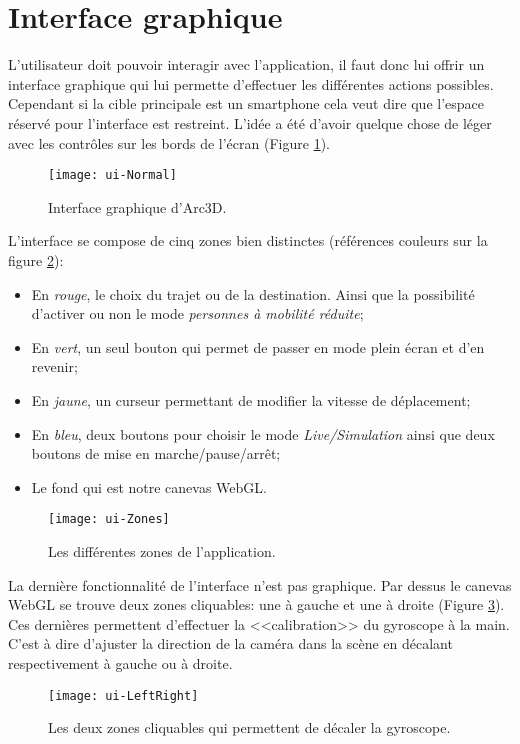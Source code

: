 \section{Interface graphique}
L'utilisateur doit pouvoir interagir avec l'application, il faut donc lui offrir un interface graphique qui lui permette d'effectuer les différentes actions possibles. Cependant si la cible principale est un smartphone cela veut dire que l'espace réservé pour l'interface est restreint. L'idée a été d'avoir quelque chose de léger avec les contrôles sur les bords de l'écran (Figure \ref{fig:ui-normal}).

\begin{figure}[H]
	\centering
	\texttt{[image: ui-Normal]}
	\caption{Interface graphique d'Arc3D.}
	\label{fig:ui-normal}
\end{figure}

L'interface se compose de cinq zones bien distinctes (références couleurs sur la figure \ref{fig:ui-zones}):
\begin{itemize}
	\item En \emph{rouge}, le choix du trajet ou de la destination. Ainsi que la possibilité d'activer ou non le mode \textit{personnes à mobilité réduite};
	\item En \emph{vert}, un seul bouton qui permet de passer en mode plein écran et d'en revenir;
	\item En \emph{jaune}, un curseur permettant de modifier la vitesse de déplacement;
	\item En \emph{bleu}, deux boutons pour choisir le mode \textit{Live/Simulation} ainsi que deux boutons de mise en marche/pause/arrêt;
	\item Le fond qui est notre canevas WebGL.
\end{itemize}

\begin{figure}[H]
	\centering
	\texttt{[image: ui-Zones]}
	\caption{Les différentes zones de l'application.}
	\label{fig:ui-zones}
\end{figure}

La dernière fonctionnalité de l'interface n'est pas graphique. Par dessus le canevas WebGL se trouve deux zones cliquables: une à gauche et une à droite (Figure \ref{fig:ui-leftright}). Ces dernières permettent d'effectuer la <<calibration>> du gyroscope à la main. C'est à dire d'ajuster la direction de la caméra dans la scène en décalant respectivement à gauche ou à droite.

\begin{figure}[H]
	\centering
	\texttt{[image: ui-LeftRight]}
	\caption{Les deux zones cliquables qui permettent de décaler la gyroscope.}
	\label{fig:ui-leftright}
\end{figure}